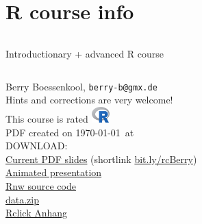 \documentclass[xcolor=table,           xcolor=dvipsnames]{beamer}\usepackage[]{graphicx}\usepackage[]{color}
\begin{document}






\section{R course info}



{
\begin{frame}
\begin{center}
    \begin{columns}
    \column{20.2em}
    \begin{block}{}{\Large Introductionary + advanced R course}
    \end{block}
    \end{columns}
\vspace{1em}
Berry Boessenkool, \texttt{berry-b@gmx.de}\\
Hints and corrections are very welcome!\\[1em]
This course is rated \includegraphics[width=0.7cm]{externalfig/Rlogo.png}\\[1em]
\scriptsize
PDF created on \today\ at \currenttime\ \\[1em]
DOWNLOAD:\\
\href{https://dl.dropboxusercontent.com/u/4836866/R_course_Berry/RcourseBerry.pdf?dl=1}{Current PDF slides} (shortlink \href{http://bit.ly/rcBerry}{bit.ly/rcBerry})\\
\href{https://dl.dropboxusercontent.com/u/4836866/R_course_Berry/RcourseBerry pres.pdf}{Animated presentation}\\
\href{https://dl.dropboxusercontent.com/u/4836866/R_course_Berry/RcourseBerry_dev.Rnw}{Rnw source code}\\
\href{https://dl.dropboxusercontent.com/u/4836866/R_course_Berry/data.zip}{data.zip}\\[1em]
\href{https://dl.dropboxusercontent.com/u/4836866/Rclick/Anhang.pdf}{Rclick Anhang}
\end{center}
\end{frame}
}
\end{document}
